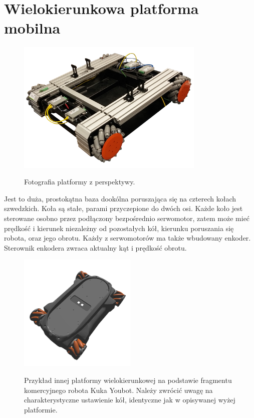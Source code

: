 \section{Wielokierunkowa platforma mobilna}
\begin{figure}[H]
\centering
 \includegraphics[width=0.8\textwidth]{graphics/base_photo.png}
\label{graphics:base_photo}
\caption{Fotografia platformy z perspektywy.}
\end{figure} 

Jest to duża, prostokątna baza dookólna poruszająca się na czterech kołach szwedzkich.
Koła są stałe, parami przyczepione do dwóch osi.
Każde koło jest sterowane osobno przez podłączony bezpośrednio serwomotor, zatem może mieć prędkość i kierunek niezależny od pozostałych kół, kierunku poruszania się robota, oraz jego obrotu.
Każdy z serwomotorów ma także wbudowany enkoder.
Sterownik enkodera zwraca aktualny kąt i prędkość obrotu.

\begin{figure}[H]
\centering
 \includegraphics[width=0.5\textwidth]{graphics/kuka_youbot.png}
\label{graphics:kuka_youbot}
\caption{Przykład innej platformy wielokierunkowej na podstawie fragmentu komercyjnego robota Kuka Youbot. Należy zwrócić uwagę na charakterystyczne ustawienie kół, identyczne jak w opisywanej wyżej platformie.}
\end{figure} 

